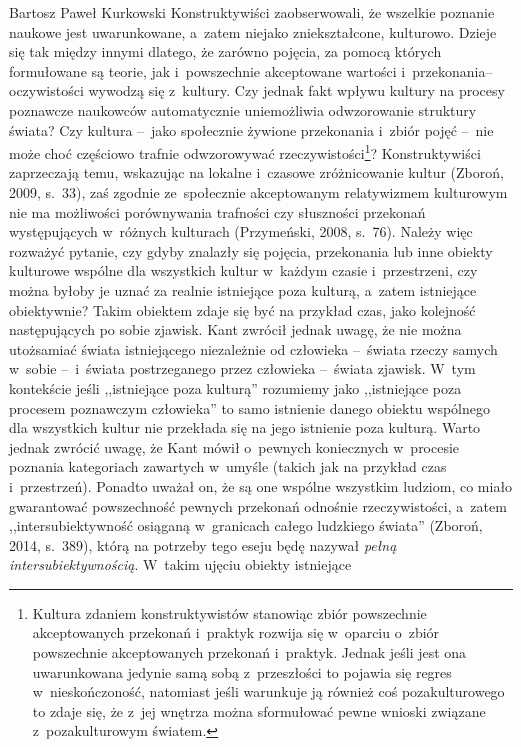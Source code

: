 \begin{artplenv}{Bartosz Paweł Kurkowski}
Konstruktywiści zaobserwowali, że wszelkie poznanie naukowe jest uwarunkowane, a~zatem niejako zniekształcone,
kulturowo. Dzieje się tak między innymi dlatego, że zarówno pojęcia, za pomocą których formułowane są teorie,
jak i~powszechnie akceptowane wartości i~przekonania–oczywistości wywodzą się z~kultury. Czy jednak fakt wpływu kultury na
procesy poznawcze naukowców automatycznie uniemożliwia odwzorowanie struktury świata? Czy kultura --~jako społecznie
żywione przekonania i~zbiór pojęć --~nie może choć częściowo trafnie odwzorowywać rzeczywistości\footnote{Kultura
zdaniem konstruktywistów stanowiąc zbiór powszechnie akceptowanych przekonań i~praktyk rozwija się w~oparciu o~zbiór
powszechnie akceptowanych przekonań i~praktyk. Jednak jeśli jest ona uwarunkowana jedynie samą sobą z~przeszłości to
pojawia się regres w~nieskończoność, natomiast jeśli warunkuje ją również coś pozakulturowego to zdaje się, że z~jej
wnętrza można sformułować pewne wnioski związane z~pozakulturowym światem.}? Konstruktywiści zaprzeczają temu,
wskazując na lokalne i~czasowe zróżnicowanie kultur \label{ref:RNDrzl88lgxF0}(Zboroń, 2009, s.~33), zaś zgodnie
ze~społecznie akceptowanym relatywizmem kulturowym nie ma możliwości porównywania trafności czy słuszności przekonań
występujących w~różnych kulturach \label{ref:RNDmsAB7rfVw4}(Przymeński, 2008, s.~76). Należy więc rozważyć pytanie, czy
gdyby znalazły się pojęcia, przekonania lub inne obiekty kulturowe wspólne dla wszystkich kultur w~każdym
czasie i~przestrzeni, czy można byłoby je uznać za realnie istniejące poza kulturą, a~zatem istniejące obiektywnie? Takim
obiektem zdaje się być na przykład czas, jako kolejność następujących po sobie zjawisk. Kant zwrócił jednak uwagę, że
nie można utożsamiać świata istniejącego niezależnie od człowieka --~świata rzeczy samych w~sobie --~i~świata
postrzeganego przez człowieka --~świata zjawisk. W~tym kontekście jeśli ,,istniejące poza kulturą'' rozumiemy jako
,,istniejące poza procesem poznawczym człowieka'' to samo istnienie danego obiektu wspólnego dla wszystkich kultur nie
przekłada się na jego istnienie poza kulturą. Warto jednak zwrócić uwagę, że Kant mówił o~pewnych
koniecznych w~procesie poznania kategoriach zawartych w~umyśle (takich jak na przykład czas i~przestrzeń).
Ponadto uważał on, że są
one wspólne wszystkim ludziom, co miało gwarantować powszechność pewnych przekonań odnośnie rzeczywistości, a~zatem
,,intersubiektywność osiąganą w~granicach całego ludzkiego świata'' \label{ref:RNDkqE0VAB20e}(Zboroń, 2014, s.~389),
którą na potrzeby tego eseju będę nazywał \textit{pełną intersubiektywnością}. W~takim ujęciu obiekty istniejące

\end{artplenv}
